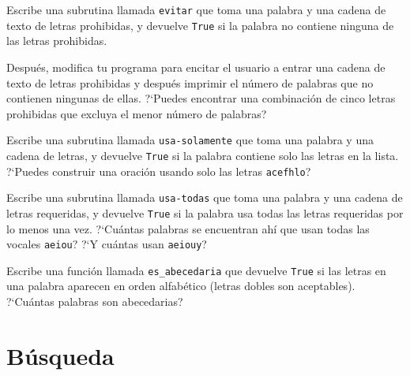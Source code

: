 \begin{exercise} 

Escribe una subrutina llamada {\tt evitar} que toma una palabra
y una cadena de texto de letras prohibidas, y devuelve {\tt True}
si la palabra no contiene ninguna de las letras prohibidas.

Después, modifica tu programa para encitar el usuario a entrar
una cadena de texto de letras prohibidas y después imprimir el número
de palabras que no contienen ningunas de ellas. ?`Puedes encontrar una
combinación de cinco letras prohibidas que excluya  el menor número
de palabras?
\end{exercise}



\begin{exercise}

Escribe una subrutina llamada \verb|usa-solamente| que toma una palabra
y una cadena de letras, y devuelve {\tt True} si la palabra contiene
solo las letras en la lista. ?`Puedes construir una oración usando solo
las letras {\tt acefhlo}?  

\end{exercise}


\begin{exercise} 

Escribe una subrutina llamada \verb|usa-todas| que toma una palabra
y una cadena de letras requeridas, y devuelve {\tt True} si la palabra
usa todas las letras requeridas por lo menos una vez. ?`Cuántas 
palabras se encuentran ahí que usan todas las vocales {\tt aeiou}? 
?`Y cuántas usan {\tt aeiouy}?

\end{exercise}


\begin{exercise}

Escribe una función llamada \verb|es_abecedaria| que devuelve
{\tt True} si las letras en una palabra aparecen en orden 
alfabético (letras dobles son aceptables). ?`Cuántas palabras
son abecedarias?


\end{exercise}



\section{Búsqueda}
\label{search}

